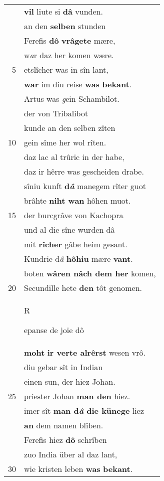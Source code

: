 \documentclass[8pt,a4paper,notitlepage]{article}
\begin{document}
\begin{table}[ht]
\begin{minipage}[t]{0.5\linewidth}
\begin{tabular}{rl}
 & \textbf{vil} liute si \textbf{dâ} vunden.\\ 
 & an den \textbf{selben} stunden\\ 
 & Ferefis \textbf{dô} \textbf{vrâgete} mære,\\ 
 & w\textit{a}r daz her komen wære.\\ 
5 & etslîcher was in sîn lant,\\ 
 & \textbf{war} im diu reise \textbf{was} \textbf{bekant}.\\ 
 & Artus was \textit{g}ein Schambilot.\\ 
 & der von Tribalibot\\ 
 & kunde an den selben zîten\\ 
10 & gein sîme her wol rîten.\\ 
 & daz lac al trûric in der habe,\\ 
 & daz ir hêrre was gescheiden drabe.\\ 
 & sîniu kunft \textbf{d\textit{â}} manegem rîter guot\\ 
 & brâhte \textbf{niht wan} hôhen muot.\\ 
15 & der burcgrâve von Kachopra\\ 
 & und al die sîne wurden dâ\\ 
 & mit \textbf{rîcher} gâbe heim gesant.\\ 
 & Kundrie d\textit{â} \textbf{hôhiu} mære \textbf{vant}.\\ 
 & boten \textbf{wâren nâch dem her} komen,\\ 
20 & Secundille hete \textbf{den} tôt genomen.\\ 
 & \begin{large}R\end{large}epanse de joie dô\\ 
 & \textbf{moht} \textbf{ir verte alrêrst} wesen vrô.\\ 
 & diu gebar sît in Indian\\ 
 & einen sun, der hiez Johan.\\ 
25 & priester Johan \textbf{man den} hiez.\\ 
 & imer sît \textbf{man d\textit{â} die künege} liez\\ 
 & \textbf{an} dem namen blîben.\\ 
 & Ferefis hiez \textbf{dô} schrîben\\ 
 & zuo India über al daz lant,\\ 
30 & wie kristen leben \textbf{was} \textbf{bekant}.\\ 
\end{tabular}

\end{minipage}
\end{table}
\end{document}
